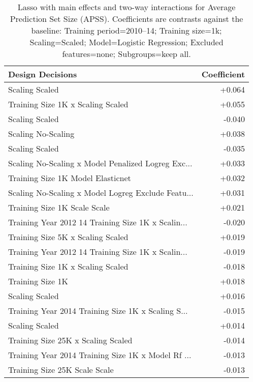 \begin{table}
\centering
\caption{Lasso with main effects and two-way interactions for Average Prediction Set Size (APSS). Coefficients are contrasts against the baseline: Training period=2010–14; Training size=1k; Scaling=Scaled; Model=Logistic Regression; Excluded features=none; Subgroups=keep all. }
\label{tab:lasso_interactions_apss}
\begin{tabular}{l r}
\toprule
                                  Design Decisions & Coefficient \\
\midrule
                                    Scaling Scaled &      +0.064 \\
                 Training Size 1K x Scaling Scaled &      +0.055 \\
                                    Scaling Scaled &      -0.040 \\
                                Scaling No-Scaling &      +0.038 \\
                                    Scaling Scaled &      -0.035 \\
Scaling No-Scaling x Model Penalized Logreg Exc... &      +0.033 \\
                 Training Size 1K Model Elasticnet &      +0.032 \\
Scaling No-Scaling x Model Logreg Exclude Featu... &      +0.031 \\
                      Training Size 1K Scale Scale &      +0.021 \\
Training Year 2012 14 Training Size 1K x Scalin... &      -0.020 \\
                 Training Size 5K x Scaling Scaled &      +0.019 \\
Training Year 2012 14 Training Size 1K x Scalin... &      -0.019 \\
                 Training Size 1K x Scaling Scaled &      -0.018 \\
                                  Training Size 1K &      +0.018 \\
                                    Scaling Scaled &      +0.016 \\
Training Year 2014 Training Size 1K x Scaling S... &      -0.015 \\
                                    Scaling Scaled &      +0.014 \\
                Training Size 25K x Scaling Scaled &      -0.014 \\
Training Year 2014 Training Size 1K x Model Rf ... &      -0.013 \\
                     Training Size 25K Scale Scale &      -0.013 \\
\bottomrule
\end{tabular}
\end{table}
